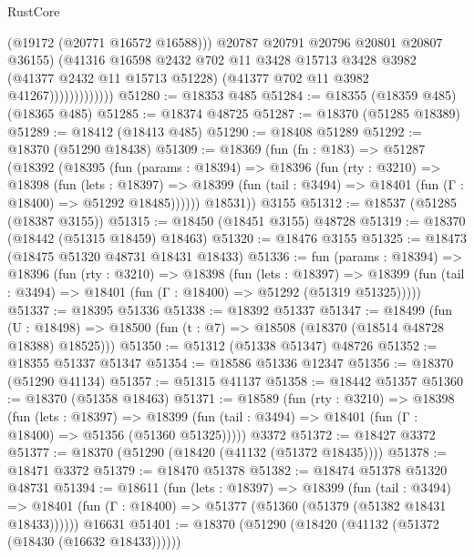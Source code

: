 \begin{lexlean}{RustCore}
\begin{coremodule}
                              (@19172 (@20771 @16572 @16588)))
                            @20787
                            @20791
                            @20796
                            @20801
                            @20807
                            @36155)
                          (@41316
                            @16598
                            @2432
                            @702
                            @11
                            @3428
                            @15713
                            @3428
                            @3982
                            (@41377 @2432 @11 @15713 @51228)
                            (@41377 @702 @11 @3982 @41267)))))))))))))
@51280 := @18353 @485
@51284 := @18355 (@18359 @485) (@18365 @485)
@51285 := @18374 @48725
@51287 := @18370 (@51285 @18389)
@51289 := @18412 (@18413 @485)
@51290 := @18408 @51289
@51292 := @18370 (@51290 @18438)
@51309 := @18369
    (fun (fn : @183) =>
    @51287
      (@18392
        (@18395
          (fun (params : @18394) =>
          @18396
            (fun (rty : @3210) =>
            @18398
              (fun (lets : @18397) =>
              @18399 (fun (tail : @3494) => @18401 (fun (Γ : @18400) => @51292 @18485))))))
        @18531))
    @3155
@51312 := @18537 (@51285 (@18387 @3155))
@51315 := @18450 (@18451 @3155) @48728
@51319 := @18370 (@18442 (@51315 @18459) @18463)
@51320 := @18476 @3155
@51325 := @18473 (@18475 @51320 @48731 @18431 @18433)
@51336 := fun (params : @18394) =>
  @18396
    (fun (rty : @3210) =>
    @18398
      (fun (lets : @18397) =>
      @18399 (fun (tail : @3494) => @18401 (fun (Γ : @18400) => @51292 (@51319 @51325)))))
@51337 := @18395 @51336
@51338 := @18392 @51337
@51347 := @18499
    (fun (U : @18498) => @18500 (fun (t : @7) => @18508 (@18370 (@18514 @48728 @18388) @18525)))
@51350 := @51312 (@51338 @51347) @48726
@51352 := @18355 @51337 @51347
@51354 := @18586 @51336 @12347
@51356 := @18370 (@51290 @41134)
@51357 := @51315 @41137
@51358 := @18442 @51357
@51360 := @18370 (@51358 @18463)
@51371 := @18589
    (fun (rty : @3210) =>
    @18398
      (fun (lets : @18397) =>
      @18399 (fun (tail : @3494) => @18401 (fun (Γ : @18400) => @51356 (@51360 @51325)))))
    @3372
@51372 := @18427 @3372
@51377 := @18370 (@51290 (@18420 (@41132 (@51372 @18435))))
@51378 := @18471 @3372
@51379 := @18470 @51378
@51382 := @18474 @51378 @51320 @48731
@51394 := @18611
    (fun (lets : @18397) =>
    @18399
      (fun (tail : @3494) =>
      @18401 (fun (Γ : @18400) => @51377 (@51360 (@51379 (@51382 @18431 @18433))))))
    @16631
@51401 := @18370 (@51290 (@18420 (@41132 (@51372 (@18430 (@16632 @18433))))))

\end{coremodule}
\end{lexlean}
